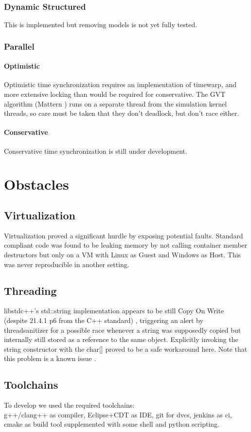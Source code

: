 \documentclass[8pt,a4paper]{report}
\begin{document}
\subsection{Dynamic Structured}
This is implemented but removing models is not yet fully tested.
\subsection{Parallel}
\subsubsection{Optimistic}
Optimistic time synchronization requires an implementation of timewarp, and more extensive locking than would be required for conservative. The GVT algorithm (Mattern \cite{Mattern}) runs on a separate thread from the simulation kernel threads, so care must be taken that they don't deadlock, but don't race either.
\subsubsection{Conservative}
Conservative time synchronization is still under development.


\chapter{Obstacles}
\section{Virtualization}
Virtualization proved a significant hurdle by exposing potential faults. Standard compliant code was found to be leaking memory by not calling container member destructors but only on a VM with Linux as Guest and Windows as Host. This was never reproducible in another setting.
\section{Threading}
libstdc++'s std::string implementation appears to be still Copy On Write (despite 21.4.1 p6 from the C++ standard) \cite{cpp}, triggering an alert by threadsanitizer for a possible race whenever a string was supposedly copied but internally still stored as a reference to the same object. Explicitly invoking the string constructor with the char[] proved to be a safe workaround here. Note that this problem is a known issue \cite{cow}.
\section{Toolchains}
To develop we used the required toolchains:\\ g++/clang++ as compiler, Eclipse+CDT as IDE, git for dvcs, jenkins as ci, cmake as build tool supplemented with some shell and python scripting.
\end{document}
